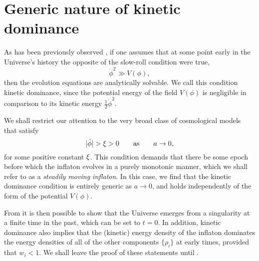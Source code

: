 \section{Generic nature of kinetic dominance}
\label{sec:The_generic_nature_of_kinetic_dominance}

As has been previously observed \citep{Linde_initial_conditions_1985,
belinsky_inflationary_1985,particle_astrophysics_1990}, if one assumes
that at some point early in the Universe's history the opposite of the
slow-roll condition  were true,
%
\begin{equation}
  \dot\phi^2\gg V(\phi),
  \label{eqn:kddef}
\end{equation}
%
then the evolution equations are analytically solvable.  We call this
condition kinetic dominance, since the potential energy of the field
$V(\phi)$ is negligible in comparison to its kinetic energy
$\frac{1}{2}\dot\phi^2$.

We shall restrict our attention to the very broad class of
cosmological models that satisfy
%
\begin{equation}
|\dot{\phi}| > \xi > 0 \qquad \text{as} \qquad a\to 0, 
\label{eqn:conditions}
\end{equation}
%
for some positive constant $\xi$.  This condition demands that
there be some epoch before which the inflaton evolves in a purely
monotonic manner, which we shall refer to as a {\em steadily moving
inflaton}. In this case, we find that the kinetic dominance condition
 is entirely generic as $a \to 0$, and holds
independently of the form of the potential $V(\phi)$.

From  it is then possible to show that the Universe
emerges from a singularity at a finite time in the past, which can be
set to $t=0$. In addition, kinetic dominance also implies that the
(kinetic) energy density of the inflaton dominates the energy
densities of all of the other components $\{\rho_i\}$ at early times,
provided that $w_i<1$. We shall leave the proof of these statements
until . 

